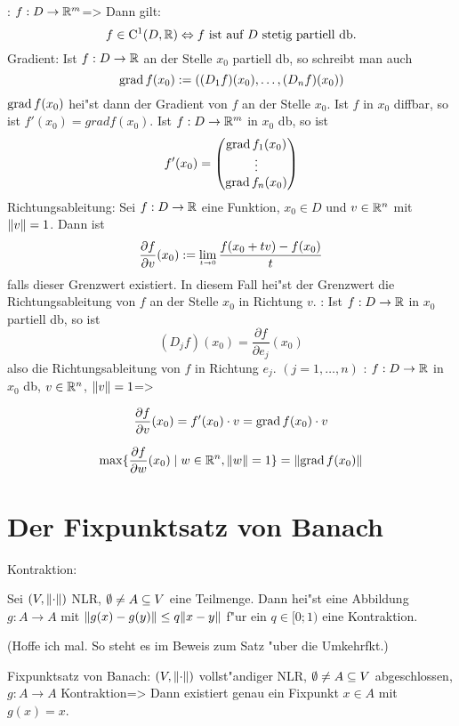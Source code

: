 \theorem:
  $f:D\to\mathbb R^m$=>{
  Dann gilt:
  \[f\in {\rm C}^1(D,\mathbb R)
    \Leftrightarrow
    \text{$f$ ist auf $D$ stetig partiell db.}
    \]
  }
\lesserdefinition Gradient:{
  Ist $f:D\to\mathbb R$ an der Stelle $x_0$ partiell db, so schreibt man auch
  \[\operatorname{grad} f(x_0):=((D_1f)(x_0),\ldots,(D_nf)(x_0))
    \]
  $\operatorname{grad} f(x_0)$ hei"st dann der Gradient von $f$ an der Stelle $x_0$. Ist
  $f$ in $x_0$ diffbar, so ist $f'(x_0)=grad f(x_0)$. Ist $f:D\to\mathbb R^m$
  in $x_0$ db, so ist
  \[f'(x_0)=\begin{pmatrix} \operatorname{grad} f_1(x_0) \\ \vdots \\ \operatorname{grad} f_n(x_0) \end{pmatrix}
    \]
  }
 Richtungsableitung:{
  Sei $f:D\to\mathbb R$ eine Funktion, $x_0\in D$ und $v\in\mathbb R^n$ mit
  ${\left\| v\right\|}=1$. Dann ist
  \[\frac{\partial f}{\partial v}(x_0) := \limes t->0 \frac{f(x_0+tv)-f(x_0)}t
    \]
  falls dieser Grenzwert existiert. In diesem Fall hei"st der Grenzwert die
  Richtungsableitung von $f$ an der Stelle $x_0$ in Richtung $v$.
  }
\remark:{
  Ist $f:D\to\mathbb R$ in $x_0$ partiell db, so ist 
  \[(D_jf)(x_0)=\frac{\partial f}{\partial e_j}(x_0)
    \]
  also die Richtungsableitung von $f$ in Richtung $e_j$. $(j=1,\ldots,n)$
  }
\theorem:
  $f:D\to\mathbb R$ in $x_0$ db, $v\in\mathbb R^n$, ${\left\| v\right\|}=1$=>{
  \begin{stmts}
    \item 
      \[\frac{\partial f}{\partial v}(x_0) = f'(x_0)\cdot v = \operatorname{grad} f(x_0)\cdot v 
        \]
    \item 
      \[\max \{ \frac{\partial f}{\partial w}(x_0) \mid 
                w\in\mathbb R^n, {\left\| w\right\|}=1
             \} = {\left\| \operatorname{grad} f(x_0)\right\|}
        \]
    \end{stmts}
  }
\section{Der Fixpunktsatz von Banach}
\lesserdefinition Kontraktion:{
  Sei $(V,{\left\| \cdot\right\|})$ NLR, $\emptyset\neq A\subseteq V$ eine Teilmenge.
  Dann hei"st eine Abbildung $g:A\to A$ mit ${\left\| g(x)-g(y)\right\|}\leq q {\left\| x-y\right\|}$ 
  f"ur ein $q\in[0;1)$ eine Kontraktion.
  
  (Hoffe ich mal. So steht es im Beweis zum Satz "uber die Umkehrfkt.)
  }
\theorem Fixpunktsatz von Banach:
  $(V,{\left\| \cdot\right\|})$ vollst"andiger NLR, $\emptyset\neq A\subseteq V$ 
  abgeschlossen, $g:A\to A$ Kontraktion=>{ 
  Dann existiert genau ein Fixpunkt $x\in A$ mit $g(x)=x$. 
  }
